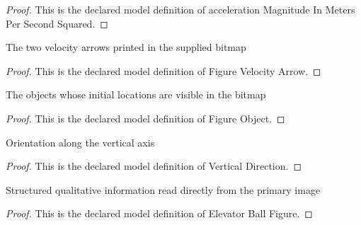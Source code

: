 \begin{proof}
  This is the declared model definition of acceleration Magnitude In Meters Per Second Squared.
\end{proof}
\begin{definition}
  \label{def:physics:phyx-mini-0754:phyxminiproblems-problemphyxmini0754-figurevelocityarrow}
  The two velocity arrows printed in the supplied bitmap
\end{definition}
\begin{proof}
  This is the declared model definition of Figure Velocity Arrow.
\end{proof}
\begin{definition}
  \label{def:physics:phyx-mini-0754:phyxminiproblems-problemphyxmini0754-figureobject}
  The objects whose initial locations are visible in the bitmap
\end{definition}
\begin{proof}
  This is the declared model definition of Figure Object.
\end{proof}
\begin{definition}
  \label{def:physics:phyx-mini-0754:phyxminiproblems-problemphyxmini0754-verticaldirection}
  Orientation along the vertical axis
\end{definition}
\begin{proof}
  This is the declared model definition of Vertical Direction.
\end{proof}
\begin{definition}
  \label{def:physics:phyx-mini-0754:phyxminiproblems-problemphyxmini0754-elevatorballfigure}
  Structured qualitative information read directly from the primary image
\end{definition}
\begin{proof}
  This is the declared model definition of Elevator Ball Figure.
\end{proof}
